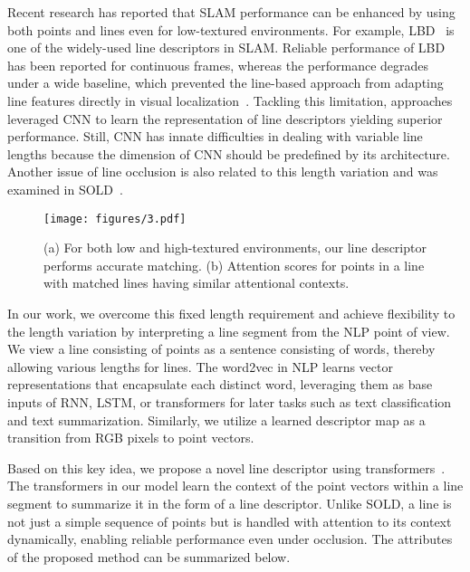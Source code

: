 \documentclass[letterpaper, 10 pt, journal, twoside]{ieeetran}
\begin{document}
Recent research has reported that \ac{SLAM} performance can be enhanced by using both points and lines \cite{Gomez2016, Pumarola2017, Gomez2019, Yang2019} even for low-textured environments. For example, \ac{LBD}~\cite{LBD2013} is one of the widely-used line descriptors in \ac{SLAM}. Reliable performance of \ac{LBD} has been reported for continuous frames, whereas the performance degrades under a wide baseline, which prevented the line-based approach from adapting line features directly in visual localization~\cite{Toft2020, Paul2019}. Tackling this limitation, approaches leveraged \acf{CNN} to learn the representation of line descriptors \cite{LLD2019, DLD2019, WLD2020} yielding superior performance. Still, \ac{CNN} has innate difficulties in dealing with variable line lengths because the dimension of \ac{CNN} should be predefined by its architecture. Another issue of line occlusion is also related to this length variation and was examined in SOLD~\cite{Pautrat2021}.

\begin{figure}[!t]
	\centering
	\texttt{[image: figures/3.pdf]}
	\caption{(a) For both low and high-textured environments, our line descriptor performs accurate matching. (b) Attention scores for points in a line with matched lines having similar attentional contexts.}
	\label{fig:main}
	\vspace{-5mm}
\end{figure}


In our work, we overcome this fixed length requirement and achieve flexibility to the length variation by interpreting a line segment from the \acf{NLP} point of view. We view a line consisting of points as a sentence consisting of words, thereby allowing various lengths for lines. The word2vec in \ac{NLP} learns vector representations that encapsulate each distinct word, leveraging them as base inputs of RNN, LSTM, or transformers for later tasks such as text classification and text summarization. Similarly, we utilize a learned descriptor map as a transition from RGB pixels to point vectors.

Based on this key idea, we propose a novel line descriptor using transformers~\cite{Vaswani2017}. The transformers in our model learn the context of the point vectors within a line segment to summarize it in the form of a line descriptor. Unlike SOLD, a line is not just a simple sequence of points but is handled with attention to its context dynamically, enabling reliable performance even under occlusion.
The attributes of the proposed method can be summarized below.
\end{document}
